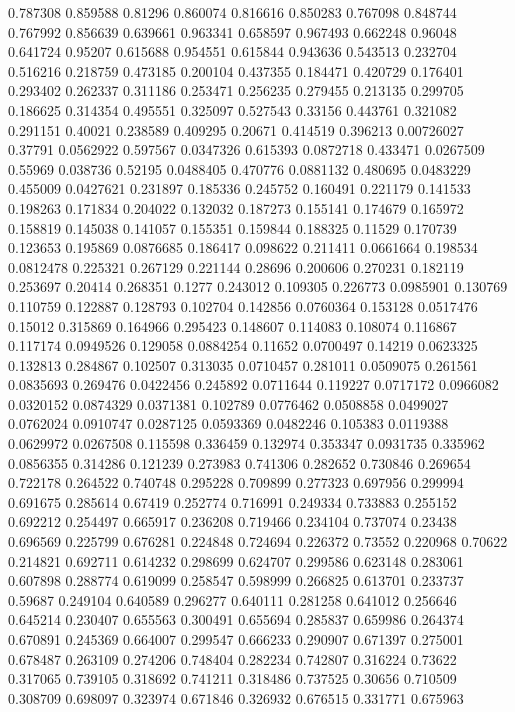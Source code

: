 0.787308 0.859588
0.81296 0.860074
0.816616 0.850283
0.767098 0.848744
0.767992 0.856639
0.639661 0.963341
0.658597 0.967493
0.662248 0.96048
0.641724 0.95207
0.615688 0.954551
0.615844 0.943636
0.543513 0.232704
0.516216 0.218759
0.473185 0.200104
0.437355 0.184471
0.420729 0.176401
0.293402 0.262337
0.311186 0.253471
0.256235 0.279455
0.213135 0.299705
0.186625 0.314354
0.495551 0.325097
0.527543 0.33156
0.443761 0.321082
0.291151 0.40021
0.238589 0.409295
0.20671 0.414519
0.396213 0.00726027
0.37791 0.0562922
0.597567 0.0347326
0.615393 0.0872718
0.433471 0.0267509
0.55969 0.038736
0.52195 0.0488405
0.470776 0.0881132
0.480695 0.0483229
0.455009 0.0427621
0.231897 0.185336
0.245752 0.160491
0.221179 0.141533
0.198263 0.171834
0.204022 0.132032
0.187273 0.155141
0.174679 0.165972
0.158819 0.145038
0.141057 0.155351
0.159844 0.188325
0.11529 0.170739
0.123653 0.195869
0.0876685 0.186417
0.098622 0.211411
0.0661664 0.198534
0.0812478 0.225321
0.267129 0.221144
0.28696 0.200606
0.270231 0.182119
0.253697 0.20414
0.268351 0.1277
0.243012 0.109305
0.226773 0.0985901
0.130769 0.110759
0.122887 0.128793
0.102704 0.142856
0.0760364 0.153128
0.0517476 0.15012
0.315869 0.164966
0.295423 0.148607
0.114083 0.108074
0.116867 0.117174
0.0949526 0.129058
0.0884254 0.11652
0.0700497 0.14219
0.0623325 0.132813
0.284867 0.102507
0.313035 0.0710457
0.281011 0.0509075
0.261561 0.0835693
0.269476 0.0422456
0.245892 0.0711644
0.119227 0.0717172
0.0966082 0.0320152
0.0874329 0.0371381
0.102789 0.0776462
0.0508858 0.0499027
0.0762024 0.0910747
0.0287125 0.0593369
0.0482246 0.105383
0.0119388 0.0629972
0.0267508 0.115598
0.336459 0.132974
0.353347 0.0931735
0.335962 0.0856355
0.314286 0.121239
0.273983 0.741306
0.282652 0.730846
0.269654 0.722178
0.264522 0.740748
0.295228 0.709899
0.277323 0.697956
0.299994 0.691675
0.285614 0.67419
0.252774 0.716991
0.249334 0.733883
0.255152 0.692212
0.254497 0.665917
0.236208 0.719466
0.234104 0.737074
0.23438 0.696569
0.225799 0.676281
0.224848 0.724694
0.226372 0.73552
0.220968 0.70622
0.214821 0.692711
0.614232 0.298699
0.624707 0.299586
0.623148 0.283061
0.607898 0.288774
0.619099 0.258547
0.598999 0.266825
0.613701 0.233737
0.59687 0.249104
0.640589 0.296277
0.640111 0.281258
0.641012 0.256646
0.645214 0.230407
0.655563 0.300491
0.655694 0.285837
0.659986 0.264374
0.670891 0.245369
0.664007 0.299547
0.666233 0.290907
0.671397 0.275001
0.678487 0.263109
0.274206 0.748404
0.282234 0.742807
0.316224 0.73622
0.317065 0.739105
0.318692 0.741211
0.318486 0.737525
0.30656 0.710509
0.308709 0.698097
0.323974 0.671846
0.326932 0.676515
0.331771 0.675963
